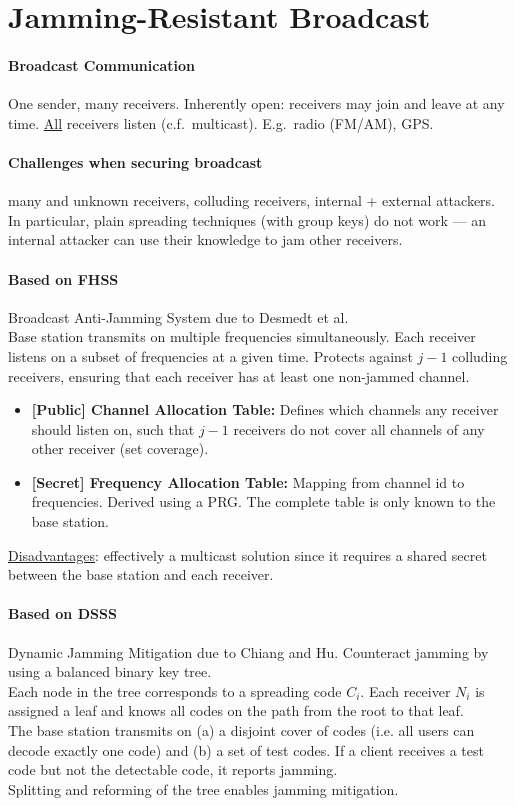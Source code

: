 \section{Jamming-Resistant Broadcast}

\paragraph{Broadcast Communication}
One sender, many receivers. Inherently open: receivers may join and leave at any time. \underline{All} receivers listen (c.f.\ multicast). E.g.\ radio (FM/AM), GPS.\@

\paragraph{Challenges when securing broadcast}
many and unknown receivers, colluding receivers, internal + external attackers.
In particular, plain spreading techniques (with group keys) do not work --- an internal attacker can use their knowledge to jam other receivers.

\paragraph{Based on FHSS}
Broadcast Anti-Jamming System due to Desmedt et al. \\
Base station transmits on multiple frequencies simultaneously.
Each receiver listens on a subset of frequencies at a given time.
Protects against $j-1$ colluding receivers, ensuring that each receiver has at least one non-jammed channel.

\begin{itemize}
	\item \textbf{[Public] Channel Allocation Table:}
	Defines which channels any receiver should listen on, such that $j-1$ receivers do not cover all channels of any other receiver (set coverage).
	\item \textbf{[Secret] Frequency Allocation Table:}
	Mapping from channel id to frequencies.
	Derived using a PRG.
	The complete table is only known to the base station.
\end{itemize}

\underline{Disadvantages}:
effectively a multicast solution since it requires a shared secret between the base station and each receiver.

\paragraph{Based on DSSS}
Dynamic Jamming Mitigation due to Chiang and Hu.
Counteract jamming by using a balanced binary key tree.
\\
Each node in the tree corresponds to a spreading code $C_i$.
Each receiver $N_i$ is assigned a leaf and knows all codes on the path from the root to that leaf.
\\
The base station transmits on (a) a disjoint cover of codes (i.e. all users can decode exactly one code) and (b) a set of test codes.
If a client receives a test code but not the detectable code, it reports jamming.
\\
Splitting and reforming of the tree enables jamming mitigation.

